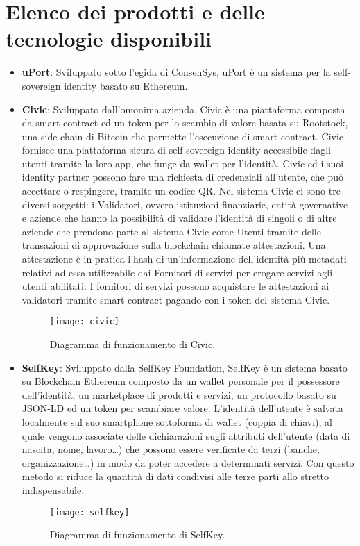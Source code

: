 \section{Elenco dei prodotti e delle tecnologie disponibili}

\begin{itemize}
  \item \textbf{uPort}:
  Sviluppato sotto l’egida di ConsenSys, uPort è un sistema per la self-sovereign identity basato su Ethereum. 
  \item \textbf{Civic}:
  Sviluppato dall’omonima azienda, Civic è una piattaforma composta da smart contract ed un token per lo scambio
  di valore basata su Rootstock, una side-chain di Bitcoin che permette l’esecuzione di smart contract.
  Civic fornisce una piattaforma sicura di self-sovereign identity accessibile dagli utenti tramite
  la loro app, che funge da wallet per l’identità.
  Civic ed i suoi identity partner possono fare una richiesta di credenziali all’utente, che può 
  accettare o respingere, tramite un codice QR.
  Nel sistema Civic ci sono tre diversi soggetti: i Validatori, ovvero istituzioni finanziarie,
  entità governative e aziende che hanno la possibilità
  di validare l’identità di singoli o di altre aziende che prendono parte al sistema
  Civic come Utenti tramite delle transazioni di approvazione sulla blockchain chiamate attestazioni.
  Una attestazione è in pratica l’hash di un’informazione dell’identità più metadati relativi ad essa
  utilizzabile dai Fornitori di servizi per erogare servizi agli utenti abilitati. I fornitori di servizi possono
  acquistare le attestazioni ai validatori tramite smart contract pagando con i token del sistema Civic.

  \begin{figure}[!ht]
    \texttt{[image: civic]}
    \caption{Diagramma di funzionamento di Civic.}
    \label{fig:civic}
  \end{figure}

  \item \textbf{SelfKey}:
  Sviluppato dalla SelfKey Foundation, SelfKey è un sistema basato su Blockchain Ethereum composto
  da un wallet personale per il possessore dell’identità, un marketplace di prodotti e servizi,
  un protocollo basato su JSON-LD ed un token per scambiare valore.
  L’identità dell’utente è salvata localmente sul suo smartphone sottoforma di wallet (coppia di chiavi),
  al quale vengono associate delle dichiarazioni sugli attributi dell’utente (data di nascita, nome, lavoro…) 
  che possono essere verificate da terzi (banche, organizzazione…)
  in modo da poter accedere a determinati servizi. Con questo metodo si riduce
  la quantità di dati condivisi alle terze parti allo stretto indispensabile.
  
  \begin{figure}[!ht]
    \texttt{[image: selfkey]}
    \caption{Diagramma di funzionamento di SelfKey.}
    \label{fig:selfkey}
  \end{figure}
\end{itemize}

